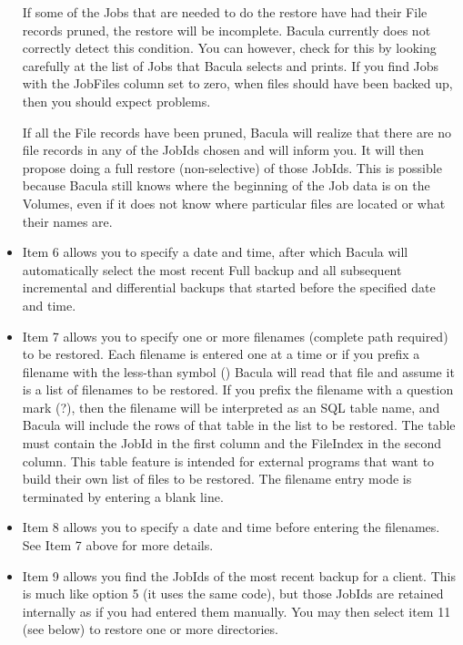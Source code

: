 \begin{itemize}
   If some of the Jobs that are needed to do the restore have had their 
   File records pruned, the restore will be incomplete. Bacula currently
   does not correctly detect this condition.  You can however, check for
   this by looking carefully at the list of Jobs that Bacula selects and
   prints. If you find Jobs with the JobFiles column set to zero, when
   files should have been backed up, then you should expect problems.

   If all the File records have been pruned, Bacula will realize that there
   are no file records in any of the JobIds chosen and will inform you. It
   will then propose doing a full restore (non-selective) of those JobIds.
   This is possible because Bacula still knows where the beginning of the
   Job data is on the Volumes, even if it does not know where particular
   files are located or what their names are.

\item Item 6 allows you to specify a date and time, after which Bacula  will
   automatically select the most recent Full backup and all  subsequent
   incremental and differential backups that started  before the specified date
   and time.  

\item Item 7 allows you to specify one or more filenames  (complete path
   required) to be restored. Each filename  is entered one at a time or if you
   prefix a filename  with the less-than symbol (\lt{}) Bacula will read that 
   file and assume it is a list of filenames to be restored.  If you
   prefix the filename with a question mark (?), then the filename will
   be interpreted as an SQL table name, and Bacula will include the rows
   of that table in the list to be restored. The table must contain the
   JobId in the first column and the FileIndex in the second column. 
   This table feature is intended for external programs that want to build
   their own list of files to be restored.
   The filename entry mode is terminated by entering a  blank line.

\item Item 8 allows you to specify a date and time before  entering the
   filenames. See Item 7 above for more  details.

\item Item 9 allows you find the JobIds of the most recent backup for
   a client. This is much like option 5 (it uses the same code), but
   those JobIds are retained internally as if you had entered them
   manually.  You may then select item 11 (see below) to restore one
   or more directories.


\end{itemize}
